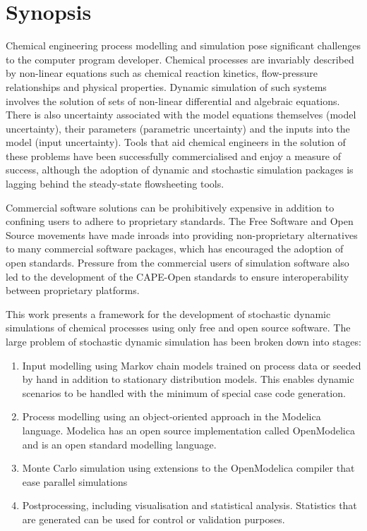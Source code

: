 \chapter*{Synopsis}

Chemical engineering process modelling and simulation pose significant challenges to the computer program developer.
Chemical processes are invariably described by non-linear equations such as chemical reaction kinetics, flow-pressure relationships and physical properties.
Dynamic simulation of such systems involves the solution of sets of non-linear differential and algebraic equations.
There is also uncertainty associated with the model equations themselves (model uncertainty), their parameters (parametric uncertainty) and the inputs into the model (input uncertainty).
Tools that aid chemical engineers in the solution of these problems have been successfully commercialised and enjoy a measure of success, although the adoption of dynamic and stochastic simulation packages is lagging behind the steady-state flowsheeting tools.

Commercial software solutions can be prohibitively expensive in addition to confining users to adhere to proprietary standards.
 The Free Software and Open Source movements have made inroads into providing non-proprietary alternatives to many commercial software packages, which has encouraged the adoption of open standards.
 Pressure from the commercial users of simulation software also led to the development of the CAPE-Open standards to ensure interoperability between proprietary platforms.

This work presents a framework for the development of stochastic dynamic simulations of chemical processes using only free and open source software.
 The large problem of stochastic dynamic simulation has been broken down into stages:
\begin{enumerate}
\item Input modelling using Markov chain models trained on process data or seeded by hand in addition to stationary distribution models. 
  This enables dynamic scenarios to be handled with the minimum of special case code generation.
\item Process modelling using an object-oriented approach in the Modelica language. 
  Modelica has an open source implementation called OpenModelica and is an open standard modelling language.
\item Monte Carlo simulation using extensions to the OpenModelica compiler that ease parallel simulations
\item Postprocessing, including visualisation and statistical analysis. 
  Statistics that are generated can be used for control or validation purposes.
\end{enumerate}

